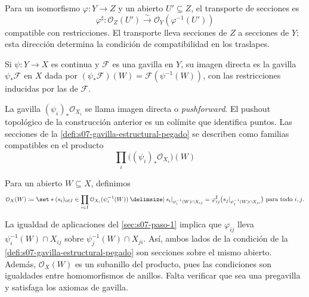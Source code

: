 Para un isomorfismo $\varphi\colon Y\to Z$ y un abierto $U'\subseteq Z$, el transporte de secciones es
\[
\varphi^\sharp\colon \mathcal O_Z(U')\xrightarrow{\sim}\mathcal O_Y(\varphi^{-1}(U'))
\]
compatible con restricciones. El transporte lleva secciones de $Z$ a secciones de $Y$; esta dirección determina la condición de compatibilidad en los traslapes.

\begin{defi}
\label{defi:s07-imagen-directa}
Si $\psi\colon Y\to X$ es continua y $\mathcal F$ es una gavilla en $Y$, su imagen directa es la gavilla $\psi_*\mathcal F$ en $X$ dada por $(\psi_*\mathcal F)(W)=\mathcal F(\psi^{-1}(W))$, con las restricciones inducidas por las de $\mathcal F$.
\end{defi}

\begin{obs}
\label{obs:s07-imagen-directa-pushout}
La gavilla $(\psi_i)_*\mathcal O_{X_i}$ se llama imagen directa o \emph{pushforward}. El pushout topológico de la construcción anterior es un colímite que identifica puntos. Las secciones de la \cref{defi:s07-gavilla-estructural-pegado} se describen como familias compatibles en el producto
\[
\prod_i\bigl((\psi_i)_*\mathcal O_{X_i}\bigr)(W)
\]
\end{obs}

\begin{defi}
\label{defi:s07-gavilla-estructural-pegado}
Para un abierto $W\subseteq X$, definimos
\[
\mathcal O_X(W)\coloneqq \set*{(s_i)_{i\in I}\in\prod_{i\in I}\mathcal O_{X_i}(\psi_i^{-1}(W))\given
s_i|_{\psi_i^{-1}(W)\cap X_{ij}}=\varphi_{ij}^{\sharp}\bigl(s_j|_{\psi_j^{-1}(W)\cap X_{ji}}\bigr)\text{ para todo }i,j}.
\]
\end{defi}

\begin{obs}
\label{obs:s07-condicion-gavilla-pegado}
La igualdad de aplicaciones del \cref{sec:s07-paso-1} implica que $\varphi_{ij}$ lleva $\psi_i^{-1}(W)\cap X_{ij}$ sobre $\psi_j^{-1}(W)\cap X_{ji}$. Así, ambos lados de la condición de la \cref{defi:s07-gavilla-estructural-pegado} son secciones sobre el mismo abierto. Además, $\mathcal O_X(W)$ es un subanillo del producto, pues las condiciones son igualdades entre homomorfismos de anillos. Falta verificar que sea una pregavilla y satisfaga los axiomas de gavilla.
\end{obs}

